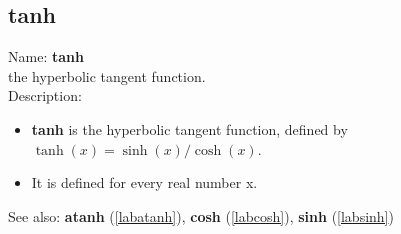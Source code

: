 \subsection{tanh}
\label{labtanh}
\noindent Name: \textbf{tanh}\\
the hyperbolic tangent function.\\
\noindent Description: \begin{itemize}

\item \textbf{tanh} is the hyperbolic tangent function, defined by $\tanh(x) = \sinh(x)/\cosh(x)$.

\item It is defined for every real number x.
\end{itemize}
See also: \textbf{atanh} (\ref{labatanh}), \textbf{cosh} (\ref{labcosh}), \textbf{sinh} (\ref{labsinh})
